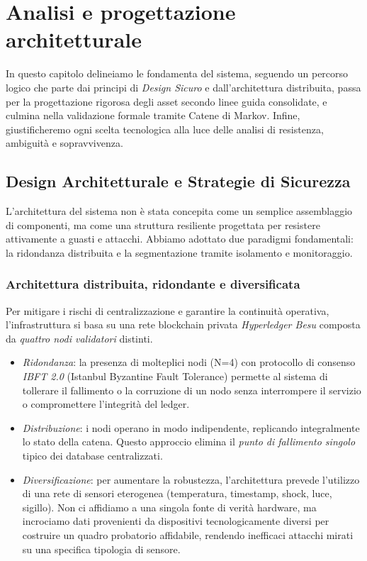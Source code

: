 \chapter{Analisi e progettazione architetturale}

\begin{preamble}
In questo capitolo delineiamo le fondamenta del sistema, seguendo un percorso logico che parte dai principi di \textit{Design Sicuro} e dall'architettura distribuita, passa per la progettazione rigorosa degli asset secondo linee guida consolidate, e culmina nella validazione formale tramite Catene di Markov. Infine, giustificheremo ogni scelta tecnologica alla luce delle analisi di resistenza, ambiguità e sopravvivenza.
\end{preamble}

\section{Design Architetturale e Strategie di Sicurezza}

L'architettura del sistema non è stata concepita come un semplice assemblaggio di componenti, ma come una struttura resiliente progettata per resistere attivamente a guasti e attacchi. Abbiamo adottato due paradigmi fondamentali: la ridondanza distribuita e la segmentazione tramite isolamento e monitoraggio.

\subsection{Architettura distribuita, ridondante e diversificata}
Per mitigare i rischi di centralizzazione e garantire la continuità operativa, l'infrastruttura si basa su una rete blockchain privata \textit{Hyperledger Besu} composta da \textit{quattro nodi validatori} distinti.
\begin{itemize}
    \item \textit{Ridondanza}: la presenza di molteplici nodi (N=4) con protocollo di consenso \textit{IBFT 2.0} (Istanbul Byzantine Fault Tolerance) permette al sistema di tollerare il fallimento o la corruzione di un nodo senza interrompere il servizio o compromettere l'integrità del ledger.
    \item \textit{Distribuzione}: i nodi operano in modo indipendente, replicando integralmente lo stato della catena. Questo approccio elimina il \textit{punto di fallimento singolo} tipico dei database centralizzati.
    \item \textit{Diversificazione}: per aumentare la robustezza, l'architettura prevede l'utilizzo di una rete di sensori eterogenea (temperatura, timestamp, shock, luce, sigillo). Non ci affidiamo a una singola fonte di verità hardware, ma incrociamo dati provenienti da dispositivi tecnologicamente diversi per costruire un quadro probatorio affidabile, rendendo inefficaci attacchi mirati su una specifica tipologia di sensore.
\end{itemize}

